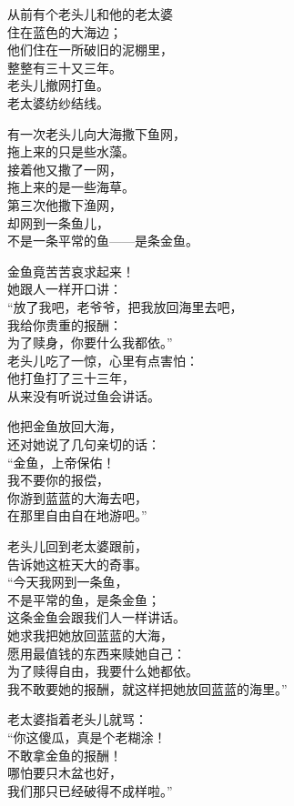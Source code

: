 \documentclass[]{book}
\renewenvironment{quote}{\begin{VF}}{\end{VF}}
\begin{document}
\begin{quote}
从前有个老头儿和他的老太婆\\
住在蓝色的大海边；\\
他们住在一所破旧的泥棚里，\\
整整有三十又三年。\\
老头儿撤网打鱼。\\
老太婆纺纱结线。

有一次老头儿向大海撒下鱼网，\\
拖上来的只是些水藻。\\
接着他又撒了一网，\\
拖上来的是一些海草。\\
第三次他撒下渔网，\\
却网到一条鱼儿，\\
不是一条平常的鱼------是条金鱼。

金鱼竟苦苦哀求起来！\\
她跟人一样开口讲：\\
``放了我吧，老爷爷，把我放回海里去吧，\\
我给你贵重的报酬：\\
为了赎身，你要什么我都依。''\\
老头儿吃了一惊，心里有点害怕：\\
他打鱼打了三十三年，\\
从来没有听说过鱼会讲话。

他把金鱼放回大海，\\
还对她说了几句亲切的话：\\
``金鱼，上帝保佑！\\
我不要你的报偿，\\
你游到蓝蓝的大海去吧，\\
在那里自由自在地游吧。''

老头儿回到老太婆跟前，\\
告诉她这桩天大的奇事。\\
``今天我网到一条鱼，\\
不是平常的鱼，是条金鱼；\\
这条金鱼会跟我们人一样讲话。\\
她求我把她放回蓝蓝的大海，\\
愿用最值钱的东西来赎她自己：\\
为了赎得自由，我要什么她都依。\\
我不敢要她的报酬，就这样把她放回蓝蓝的海里。''

老太婆指着老头儿就骂：\\
``你这傻瓜，真是个老糊涂！\\
不敢拿金鱼的报酬！\\
哪怕要只木盆也好，\\
我们那只已经破得不成样啦。''


\end{quote}
\end{document}
